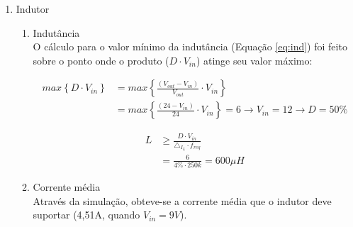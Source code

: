 \documentclass[a4paper]{article}
\begin{document}
{\begin{enumerate}
\begin{enumerate}
\end{enumerate}
\item Indutor
\begin{enumerate}
\item Indutância \\
O cálculo para o valor mínimo da indutância (Equação \ref{eq:ind}) foi feito sobre o ponto onde o produto ($D \cdot V_{in}$) atinge seu valor máximo:

\begin{equation}
\label{eq:max_d_vin}
\begin{split}
max\left\{ D \cdot V_{in} \right\} & = max\left\{ \frac{(V_{out}-V_{in})}{V_{out} } \cdot V_{in} \right\} \\
& = max\left\{ \frac{(24-V_{in})}{24} \cdot V_{in} \right\} = 6 \rightarrow V_{in} = 12 \rightarrow D = 50\%
\end{split}
\end{equation}

\begin{equation}
\label{eq:ind}
\begin{split}
L & \geq \frac{D \cdot V_{in}}{{\triangle}_{I_{L}}\cdot f_{req}} \\
& = \frac{6}{{4\%}\cdot 250k} = 600 \mu H
\end{split}
\end{equation}


\item Corrente média \\
\label{subsub:corrente-media}
Através da simulação, obteve-se a corrente média que o indutor deve suportar (4,51A, quando $V_{in} = 9V$).


\end{enumerate}
\end{enumerate}}
\end{document}
